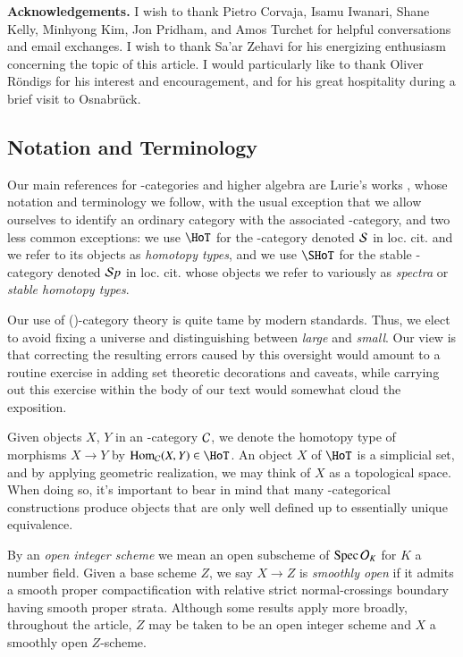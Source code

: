 \bigskip

\noindent
\textbf{Acknowledgements.}
I wish to thank Pietro Corvaja, Isamu Iwanari, Shane Kelly, Minhyong Kim, Jon Pridham, and Amos Turchet for helpful conversations and email exchanges. I wish to thank Sa'ar Zehavi for his energizing enthusiasm concerning the topic of this article. I would particularly like to thank Oliver R\"ondigs for his interest and encouragement, and for his great hospitality during a brief visit to Osnabr\"uck. 


\medskip
\subsection{Notation and Terminology}
\label{notation}
Our main references for \oo-categories and higher algebra are Lurie's works \cite{LurieTopos, LurieHA}, whose notation and terminology we follow, with the usual exception that we allow ourselves to identify an ordinary category with the associated \oo-category, and two less common exceptions: we use $\HoT$ for the \oo-category denoted $\mathcal{S}$ in loc. cit. and we refer to its objects as \textit{homotopy types}, and we use $\SHoT$ for the stable \oo-category denoted $\mathcal{S} p$ in loc. cit. whose objects we refer to variously as \textit{spectra} or \textit{stable homotopy types}.

Our use of (\oo)-category theory is quite tame by modern standards. Thus, we elect to avoid fixing a universe and distinguishing between \textit{large} and \textit{small}. Our view is that correcting the resulting errors caused by this oversight would amount to a routine exercise in adding set theoretic decorations and caveats, while carrying out this exercise within the body of our text would somewhat cloud the exposition. 

Given objects $X$, $Y$ in an \oo-category $\mathcal{C}$, we denote the homotopy type of morphisms $X \to Y$ by $\Hom_\Cc(X,Y) \in \HoT$. An object $X$ of $\HoT$ is a simplicial set, and by applying geometric realization, we may think of $X$ as a topological space. When doing so, it's important to bear in mind that many \oo-categorical constructions produce objects that are only well defined up to essentially unique equivalence. 

By an \emph{open integer scheme} we mean an open subscheme of $\operatorname{Spec} \mathcal{O}_K$ for $K$ a number field. Given a base scheme $Z$, we say $X \to Z$ is \emph{smoothly open} if it admits a smooth proper compactification with relative strict normal-crossings boundary having smooth proper strata. Although some results apply more broadly, throughout the article, $Z$ may be taken to be an open integer scheme and $X$ a smoothly open $Z$-scheme. 

